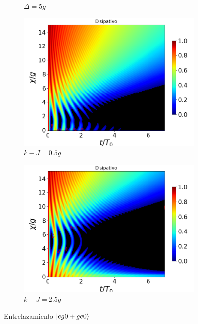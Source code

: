 \begin{figure}[h!]
\begin{subfigure}{0.49\textwidth}
        \caption{$\Delta=5g$}
        \label{fig4:concu x d2}
    \end{subfigure}
    \vfill
    \begin{subfigure}{0.49\textwidth}
        \includegraphics[width=\textwidth]{figuras/ch4/concu/chi/eg0+ge0 d=0.0g k=0.5g J=0.0g gamma=0.25g concu chi dis.png}
        \caption{$k-J=0.5g$}
        \label{fig4:concu x k1}
    \end{subfigure}
    \hfill
    \begin{subfigure}{0.49\textwidth}
        \includegraphics[width=\textwidth]{figuras/ch4/concu/chi/eg0+ge0 d=0.0g k=2.5g J=0.0g gamma=0.25g concu chi dis.png}
        \caption{$k-J=2.5g$}
        \label{fig4:concu x k2}
    \end{subfigure}
    \caption{Entrelazamiento $\ket{eg0+ge0}$}
    \label{fig4:concu x params}
\end{figure}
\newpage
